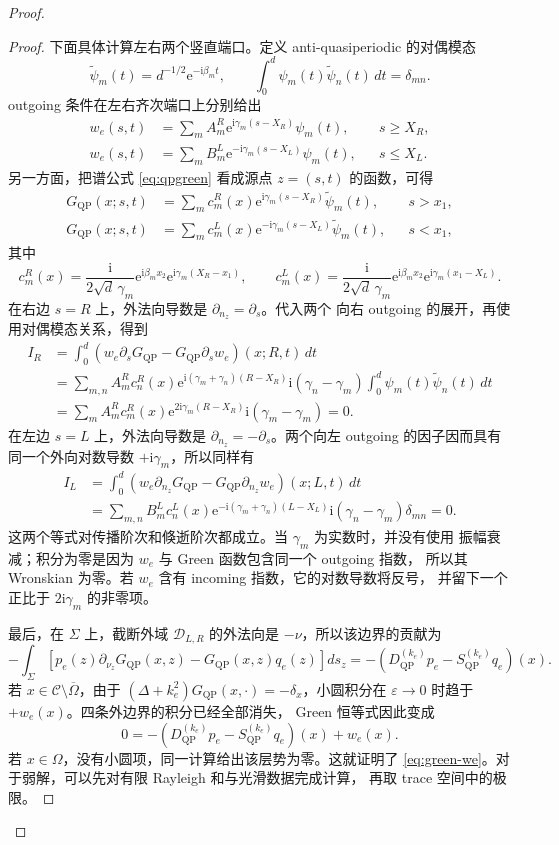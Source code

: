 \documentclass[UTF8,11pt,fontset=fandol]{ctexart}
\newcommand{\C}{\mathcal C}
\newcommand{\Om}{\Omega}
\newcommand{\Sig}{\Sigma}
\newcommand{\ii}{\mathrm i}
\newcommand{\ee}{\mathrm e}
\newcommand{\QP}{\mathrm{QP}}
\theoremstyle{plain}
\theoremstyle{definition}
\theoremstyle{remark}
\begin{document}
\begin{proof}
\begin{proof}
下面具体计算左右两个竖直端口。定义 anti-quasiperiodic 的对偶模态
\[
\widetilde\psi_m(t)=d^{-1/2}\ee^{-\ii\beta_m t},\qquad
\int_0^d\psi_m(t)\widetilde\psi_n(t)\,dt=\delta_{mn}.
\]
outgoing 条件在左右齐次端口上分别给出
\[
\begin{aligned}
w_e(s,t)&=\sum_m A_m^R
 \ee^{\ii\gamma_m(s-X_R)}\psi_m(t),&&s\geq X_R,\\
w_e(s,t)&=\sum_m B_m^L
 \ee^{-\ii\gamma_m(s-X_L)}\psi_m(t),&&s\leq X_L.
\end{aligned}
\]
另一方面，把谱公式 \eqref{eq:qpgreen} 看成源点 \(z=(s,t)\) 的函数，可得
\[
\begin{aligned}
G_{\QP}(x;s,t)
 &=\sum_m c_m^R(x)\ee^{\ii\gamma_m(s-X_R)}
   \widetilde\psi_m(t),&&s>x_1,\\
G_{\QP}(x;s,t)
 &=\sum_m c_m^L(x)\ee^{-\ii\gamma_m(s-X_L)}
   \widetilde\psi_m(t),&&s<x_1,
\end{aligned}
\]
其中
\[
c_m^R(x)=\frac{\ii}{2\sqrt d\,\gamma_m}
 \ee^{\ii\beta_mx_2}\ee^{\ii\gamma_m(X_R-x_1)},\qquad
c_m^L(x)=\frac{\ii}{2\sqrt d\,\gamma_m}
 \ee^{\ii\beta_mx_2}\ee^{\ii\gamma_m(x_1-X_L)}.
\]
在右边 \(s=R\) 上，外法向导数是 \(\partial_{n_z}=\partial_s\)。代入两个
向右 outgoing 的展开，再使用对偶模态关系，得到
\[
\begin{aligned}
I_R
&=\int_0^d\left(w_e\partial_sG_{\QP}
                 -G_{\QP}\partial_sw_e\right)(x;R,t)\,dt\\
&=\sum_{m,n}A_m^R c_n^R(x)
 \ee^{\ii(\gamma_m+\gamma_n)(R-X_R)}
 \ii(\gamma_n-\gamma_m)
 \int_0^d\psi_m(t)\widetilde\psi_n(t)\,dt\\
&=\sum_m A_m^R c_m^R(x)
 \ee^{2\ii\gamma_m(R-X_R)}\ii(\gamma_m-\gamma_m)=0.
\end{aligned}
\]
在左边 \(s=L\) 上，外法向导数是 \(\partial_{n_z}=-\partial_s\)。两个向左
outgoing 的因子因而具有同一个外向对数导数 \(+\ii\gamma_m\)，所以同样有
\[
\begin{aligned}
I_L
&=\int_0^d\left(w_e\partial_{n_z}G_{\QP}
                 -G_{\QP}\partial_{n_z}w_e\right)(x;L,t)\,dt\\
&=\sum_{m,n}B_m^L c_n^L(x)
 \ee^{-\ii(\gamma_m+\gamma_n)(L-X_L)}
 \ii(\gamma_n-\gamma_m)\delta_{mn}=0.
\end{aligned}
\]
这两个等式对传播阶次和倏逝阶次都成立。当 \(\gamma_m\) 为实数时，并没有使用
振幅衰减；积分为零是因为 \(w_e\) 与 Green 函数包含同一个 outgoing 指数，
所以其 Wronskian 为零。若 \(w_e\) 含有 incoming 指数，它的对数导数将反号，
并留下一个正比于 \(2\ii\gamma_m\) 的非零项。

最后，在 \(\Sig\) 上，截断外域 \(\mathcal D_{L,R}\) 的外法向是
\(-\nu\)，所以该边界的贡献为
\[
-\int_\Sig\left[p_e(z)\partial_{\nu_z}G_{\QP}(x,z)
                 -G_{\QP}(x,z)q_e(z)\right]ds_z
=-\left(D_{\QP}^{(k_e)}p_e-S_{\QP}^{(k_e)}q_e\right)(x).
\]
若 \(x\in\C\setminus\overline\Om\)，由于
\((\Delta+k_e^2)G_{\QP}(x,\cdot)=-\delta_x\)，小圆积分在
\(\varepsilon\to0\) 时趋于 \(+w_e(x)\)。四条外边界的积分已经全部消失，
Green 恒等式因此变成
\[
0=-\left(D_{\QP}^{(k_e)}p_e-S_{\QP}^{(k_e)}q_e\right)(x)+w_e(x).
\]
若 \(x\in\Om\)，没有小圆项，同一计算给出该层势为零。这就证明了
\eqref{eq:green-we}。对于弱解，可以先对有限 Rayleigh 和与光滑数据完成计算，
再取 trace 空间中的极限。
\end{proof}


\end{proof}
\end{document}
